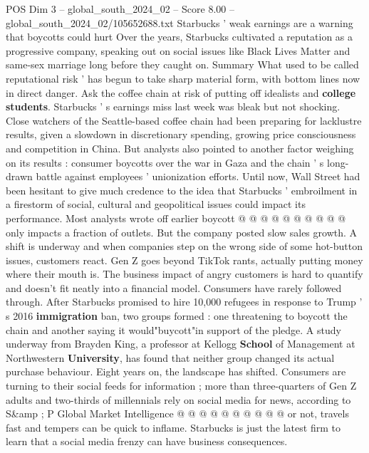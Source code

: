 \begin{textsample}{POS Dim 3 – global\_south\_2024\_02 – Score 8.00 – global\_south\_2024\_02/105652688.txt}  \label{ex:f3_pos_363}
Starbucks ' weak earnings are a warning that boycotts could hurt Over the years, Starbucks cultivated a reputation as a progressive company, speaking out on social issues like Black Lives Matter and same-sex marriage long before they caught on.
Summary What used to be called reputational risk ' has begun to take sharp material form, with bottom lines now in direct danger.
Ask the coffee chain at risk of putting off idealists and \textbf{college} \textbf{students}.
Starbucks ' s earnings miss last week was bleak but not shocking.
Close watchers of the Seattle-based coffee chain had been preparing for lacklustre results, given a slowdown in discretionary spending, growing price consciousness and competition in China.
But analysts also pointed to another factor weighing on its results : consumer boycotts over the war in Gaza and the chain ' s long-drawn battle against employees ' unionization efforts.
Until now, Wall Street had been hesitant to give much credence to the idea that Starbucks ' embroilment in a firestorm of social, cultural and geopolitical issues could impact its performance.
Most analysts wrote off earlier boycott @ @ @ @ @ @ @ @ @ @ only impacts a fraction of outlets.
But the company posted slow sales growth.
A shift is underway and when companies step on the wrong side of some hot-button issues, customers react.
Gen Z goes beyond TikTok rants, actually putting money where their mouth is.
The business impact of angry customers is hard to quantify and doesn't fit neatly into a financial model.
Consumers have rarely followed through.
After Starbucks promised to hire 10,000 refugees in response to Trump ' s 2016 \textbf{immigration} ban, two groups formed : one threatening to boycott the chain and another saying it would"buycott"in support of the pledge.
A study underway from Brayden King, a professor at Kellogg \textbf{School} of Management at Northwestern \textbf{University}, has found that neither group changed its actual purchase behaviour.
Eight years on, the landscape has shifted.
Consumers are turning to their social feeds for information ; more than three-quarters of Gen Z adults and two-thirds of millennials rely on social media for news, according to S\&amp ; P Global Market Intelligence @ @ @ @ @ @ @ @ @ @ or not, travels fast and tempers can be quick to inflame.
Starbucks is just the latest firm to learn that a social media frenzy can have business consequences.

\end{textsample}
